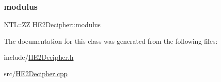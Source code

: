 \subsubsection{\texorpdfstring{modulus}{modulus}}
{\footnotesize\ttfamily N\+T\+L\+::\+ZZ H\+E2\+Decipher\+::modulus\hspace{0.3cm}{\ttfamily [protected]}}



The documentation for this class was generated from the following files\+:\begin{DoxyCompactItemize}
\item 
include/\hyperlink{HE2Decipher_8h}{H\+E2\+Decipher.\+h}\item 
src/\hyperlink{HE2Decipher_8cpp}{H\+E2\+Decipher.\+cpp}\end{DoxyCompactItemize}
